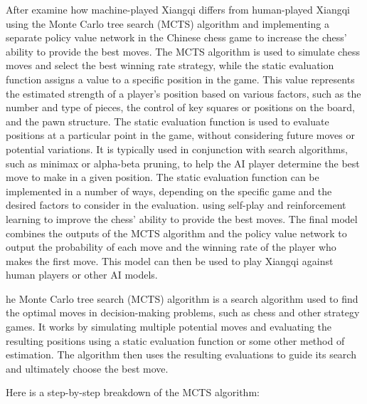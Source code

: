 \documentclass[10pt,twocolumn]{article}
\begin{document}
    After examine how machine-played Xiangqi differs from human-played Xiangqi using the Monte Carlo tree search (MCTS) algorithm and implementing a separate policy value network in the Chinese chess game to increase the chess' ability to provide the best moves. The MCTS algorithm is used to simulate chess moves and select the best winning rate strategy, while the static evaluation function assigns a value to a specific position in the game. This value represents the estimated strength of a player's position based on various factors, such as the number and type of pieces, the control of key squares or positions on the board, and the pawn structure. The static evaluation function is used to evaluate positions at a particular point in the game, without considering future moves or potential variations. It is typically used in conjunction with search algorithms, such as minimax or alpha-beta pruning, to help the AI player determine the best move to make in a given position. The static evaluation function can be implemented in a number of ways, depending on the specific game and the desired factors to consider in the evaluation. using self-play and reinforcement learning to improve the chess' ability to provide the best moves. The final model combines the outputs of the MCTS algorithm and the policy value network to output the probability of each move and the winning rate of the player who makes the first move. This model can then be used to play Xiangqi against human players or other AI models.

    he Monte Carlo tree search (MCTS) algorithm is a search algorithm used to find the optimal moves in decision-making problems, such as chess and other strategy games. It works by simulating multiple potential moves and evaluating the resulting positions using a static evaluation function or some other method of estimation. The algorithm then uses the resulting evaluations to guide its search and ultimately choose the best move.

    Here is a step-by-step breakdown of the MCTS algorithm:
\end{document}
